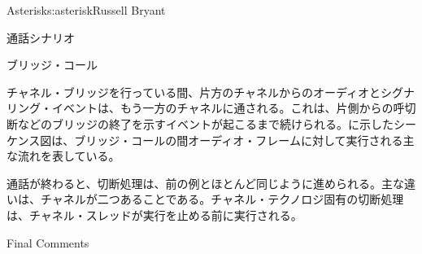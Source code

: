 \begin{aosachapter}{Asterisk}{s:asterisk}{Russell Bryant}
\begin{aosasect1}{通話シナリオ}
\begin{aosasect2}{ブリッジ・コール}

チャネル・ブリッジを行っている間、片方のチャネルからのオーディオとシグナリング・イベントは、もう一方のチャネルに通される。これは、片側からの呼切断などのブリッジの終了を示すイベントが起こるまで続けられる。に示したシーケンス図は、ブリッジ・コールの間オーディオ・フレームに対して実行される主な流れを表している。


通話が終わると、切断処理は、前の例とほとんど同じように進められる。主な違いは、チャネルが二つあることである。チャネル・テクノロジ固有の切断処理は、チャネル・スレッドが実行を止める前に実行される。

\end{aosasect2}

\end{aosasect1}

\begin{aosasect1}{Final Comments}


\end{aosasect1}
\end{aosachapter}
